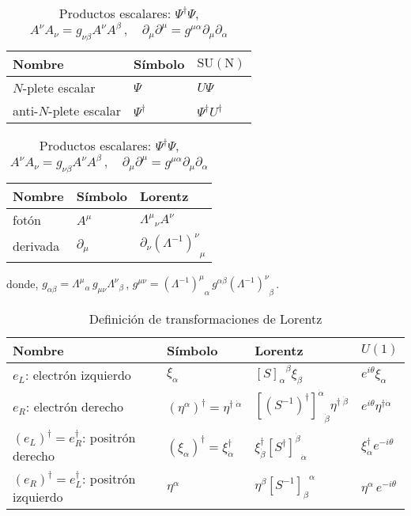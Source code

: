 \begin{frame}

\begin{table}
  \centering
   \begin{tabular}{lll}
    Nombre & Símbolo & $\operatorname{SU(N)}$ \\\hline
    $N$-plete escalar & $\Psi$ & $U \Psi$ \\
    anti-$N$-plete escalar & $\Psi^\dagger $ & $\Psi^\dagger U^\dagger $ \\\hline
    \end{tabular}\hspace{3cm}
   \begin{tabular}{lll}
    Nombre & Símbolo & Lorentz \\\hline
    fotón & $A^\mu$ & ${\Lambda^\mu}_\nu A^\nu$ \\
    derivada & $\partial_\mu$ & $\partial_\nu {\left(\Lambda^{-1}\right)^\nu}_\mu$ \\\hline
  \end{tabular}
  \caption{
       Productos escalares: $\Psi^\dagger \Psi$,  \hspace{4cm}
      $A^\nu A_\nu= g_{\nu \beta}  A^\nu  A^{\beta}\,,\quad \partial_\mu  \partial^\mu=g^{\mu\alpha}\partial_\mu\partial_{\alpha}$
}
  \label{tab:fermionlr}
\end{table}
donde,
 $g_{\alpha\beta}={\Lambda^{\mu}}_{\alpha}\,g_{\mu\nu}{\Lambda^{\nu}}_{\beta}\,$,
  $g^{\mu\nu}={\left( \Lambda^{-1} \right)^{\mu}}_{\alpha}\,g^{\alpha\beta} {\left( \Lambda^{-1} \right)^{\nu}}_{\beta}\,$.


\begin{table}
  \centering
  \begin{tabular}{llll}
    Nombre & Símbolo & Lorentz & $U(1)$\\\hline\hline
    $e_L$: electrón izquierdo & $\xi_{\alpha}$ & ${\left[ S \right]_{\alpha}}^{\beta}\xi_{\beta}$ & $e^{i\theta}\xi_\alpha$\\
    $e_R$: electrón derecho   & $\left( \eta^{\alpha} \right)^{\dagger}=\eta^{\dagger\;\dot{\alpha}}$ & ${\left[ \left( S^{-1} \right)^\dagger \right]^{\dot{\alpha}}}_{\dot{\beta}}\eta^{\dagger\;\dot{\beta}}$& $e^{i\theta}\eta^{\dagger\dot{\alpha}}$\\
    \hline    
    $\left( e_L \right)^{\dagger}=e^{\dagger}_R$: positrón derecho   & $\left( \xi_{\alpha} \right)^{\dagger}=\xi^{\dagger}_{\dot{\alpha}}$ &
     $\xi^{\dagger}_{\dot{\beta}}{\left[{S^{\dagger}}\right]^{\dot{\beta}}}_{\dot{\alpha}}$ & $\xi^\dagger_{\dot{\alpha}} e^{-i\theta}$\\
   $\left( e_R \right)^{\dagger}=e^{\dagger}_L$: positrón izquierdo&$\eta^{\alpha}$& $\eta^\beta{\left[  S^{-1}  \right]_{\beta}}^{\alpha}$ & $\eta^\alpha\, e^{-i\theta}$\\\hline\hline
  \end{tabular}
  \caption{Definición de transformaciones de Lorentz}
  \label{tab:fermionlr}
\end{table}


\end{frame}
